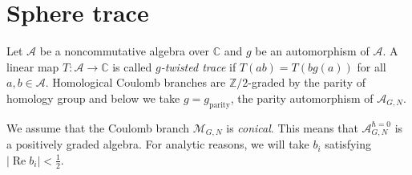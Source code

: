 \documentclass{article}
\renewcommand{\C}{\mathbb{C}}
\newcommand{\Z}{\mathbb{Z}}
\newcommand{\mc}[1]{\mathcal{#1}}
\renewcommand{\Re}{\operatorname{Re}}
\newcommand{\abs}[1]{\lvert #1\rvert}
\begin{document}
\section{Sphere trace}
\label{SecSphere}
Let $\mc{A}$ be a noncommutative algebra over $\C$ and $g$ be an automorphism of $\mc{A}$. A linear map $T\colon \mc{A}\to\C$ is called {\it $g$-twisted trace} if $T(ab)=T(bg(a))$ for all $a,b\in \mc{A}$. Homological Coulomb branches are $\Z/2$-graded by the parity of homology group and below we take $g=g_{\text{parity}}$, the parity automorphism of $\mc{A}_{G,N}.$

We assume that the Coulomb branch $\mc{M}_{G,N}$ is {\it conical}. This means that $\mc{A}_{G,N}^{\hbar=0}$ is a positively graded algebra. For analytic reasons, we will take $b_i$ satisfying $\abs{\Re b_i}<\tfrac 12$. 
\end{document}
